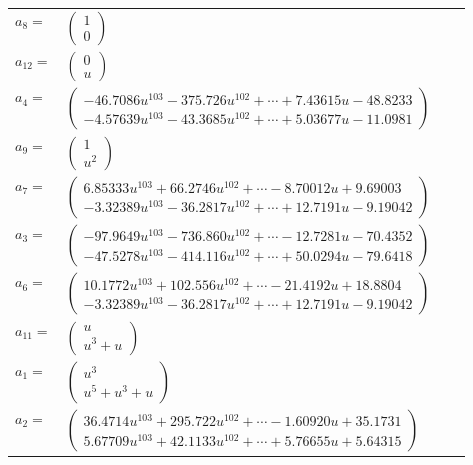\documentclass[1p]{elsarticle_modified}
\theoremstyle{definition}
\begin{document}
\begin{tabular}{m{7pt} m{180pt} m{7pt} m{180pt} }
\flushright $a_{8}=$&$\begin{pmatrix}1\\0\end{pmatrix}$ \\
\flushright $a_{12}=$&$\begin{pmatrix}0\\u\end{pmatrix}$ \\
\flushright $a_{4}=$&$\begin{pmatrix}-46.7086 u^{103}-375.726 u^{102}+\cdots+7.43615 u-48.8233\\-4.57639 u^{103}-43.3685 u^{102}+\cdots+5.03677 u-11.0981\end{pmatrix}$ \\
\flushright $a_{9}=$&$\begin{pmatrix}1\\u^2\end{pmatrix}$ \\
\flushright $a_{7}=$&$\begin{pmatrix}6.85333 u^{103}+66.2746 u^{102}+\cdots-8.70012 u+9.69003\\-3.32389 u^{103}-36.2817 u^{102}+\cdots+12.7191 u-9.19042\end{pmatrix}$ \\
\flushright $a_{3}=$&$\begin{pmatrix}-97.9649 u^{103}-736.860 u^{102}+\cdots-12.7281 u-70.4352\\-47.5278 u^{103}-414.116 u^{102}+\cdots+50.0294 u-79.6418\end{pmatrix}$ \\
\flushright $a_{6}=$&$\begin{pmatrix}10.1772 u^{103}+102.556 u^{102}+\cdots-21.4192 u+18.8804\\-3.32389 u^{103}-36.2817 u^{102}+\cdots+12.7191 u-9.19042\end{pmatrix}$ \\
\flushright $a_{11}=$&$\begin{pmatrix}u\\u^3+u\end{pmatrix}$ \\
\flushright $a_{1}=$&$\begin{pmatrix}u^3\\u^5+u^3+u\end{pmatrix}$ \\
\flushright $a_{2}=$&$\begin{pmatrix}36.4714 u^{103}+295.722 u^{102}+\cdots-1.60920 u+35.1731\\5.67709 u^{103}+42.1133 u^{102}+\cdots+5.76655 u+5.64315\end{pmatrix}$ \\

\end{tabular}
\end{document}
